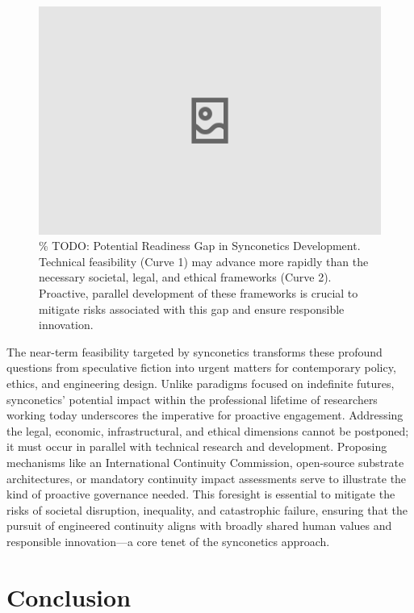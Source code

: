 \documentclass[10pt]{article}
\begin{document}
\begin{sloppypar}
  \begin{figure}[ht!]
    \centering
    \includegraphics[width=\textwidth]{figures/readiness-gap.png}
    \caption{\% TODO: Potential Readiness Gap in Synconetics Development. Technical feasibility (Curve 1) may advance more rapidly than the necessary societal, legal, and ethical frameworks (Curve 2). Proactive, parallel development of these frameworks is crucial to mitigate risks associated with this gap and ensure responsible innovation.}
    \label{fig:readiness-gap}
  \end{figure}

  The near-term feasibility targeted by synconetics transforms these profound questions from speculative fiction into urgent matters for contemporary policy, ethics, and engineering design. Unlike paradigms focused on indefinite futures, synconetics’ potential impact within the professional lifetime of researchers working today underscores the imperative for proactive engagement. Addressing the legal, economic, infrastructural, and ethical dimensions cannot be postponed; it must occur in parallel with technical research and development. Proposing mechanisms like an International Continuity Commission, open-source substrate architectures, or mandatory continuity impact assessments serve to illustrate the kind of proactive governance needed. This foresight is essential to mitigate the risks of societal disruption, inequality, and catastrophic failure, ensuring that the pursuit of engineered continuity aligns with broadly shared human values and responsible innovation—a core tenet of the synconetics approach.

  \section{Conclusion}
  \label{sec:conclusion}


\end{sloppypar}
\end{document}

